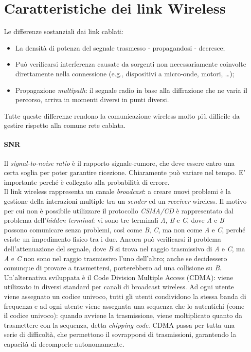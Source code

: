 \section{Caratteristiche dei link Wireless}
Le differenze sostanziali dai link cablati:
\begin{itemize}
	\item La densità di potenza del segnale trasmesso - propagandosi - decresce;
	\item Può verificarsi interferenza causate da sorgenti non necessariamente coinvolte direttamente nella connessione (e.g., dispositivi a micro-onde, motori, \ldots);
	\item Propagazione \textit{multipath}: il segnale radio in base alla diffrazione che ne varia il percorso, arriva in momenti diversi in punti diversi.
\end{itemize}
Tutte queste differenze rendono la comunicazione wireless molto più difficile da gestire rispetto alla comune rete cablata.

\paragraph{SNR}
Il \textit{signal-to-noise ratio} è il rapporto signale-rumore, che deve essere entro una certa soglia per poter garantire ricezione. Chiaramente può variare nel tempo. E' importante perché è collegato alla probabilità di errore. \\

Il link wireless rappresenta un canale \textit{broadcast}: a creare nuovi problemi è la gestione della interazioni multiple tra un \textit{sender} ed un \textit{receiver} wireless. Il motivo per cui non è possibile utilizzare il protocollo \textit{CSMA/CD} è rappresentato dal problema dell'\textit{hidden terminal}: vi sono tre terminali \textit{A}, \textit{B} e \textit{C}, dove \textit{A} e \textit{B} possono comunicare senza problemi, così come \textit{B}, \textit{C}, ma non come \textit{A} e \textit{C}, perché esiste un impedimento fisico tra i due. Ancora può verificarsi il problema dell'attenuazione del segnale, dove \textit{B} si trova nel raggio trasmissivo di \textit{A} e \textit{C}, ma \textit{A} e \textit{C} non sono nel raggio trasmissivo l'uno dell'altro; anche se decidessero comunque di provare a trasmettersi, porterebbero ad una collisione su \textit{B}. \\
Un'alternativa sviluppata è il Code Division Multiple Access (CDMA): viene utilizzato in diversi standard per canali di broadcast wireless. Ad ogni utente viene assegnato un codice univoco, tutti gli utenti condividono la stessa banda di frequenza e ad ogni utente viene assegnata una sequenza che lo autentichi (come il codice univoco): quando avviene la trasmissione, viene moltiplicato quanto da trasmettere con la sequenza, detta \textit{chipping code}. CDMA passa per tutta una serie di difficoltà, che permettono il sovrapporsi di trasmissioni, garantendo la capacità di decomporle autonomamente.

